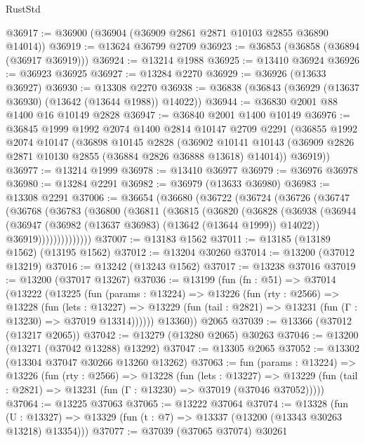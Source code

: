 \begin{lexlean}{RustStd}
\begin{coremodule}
@36917 := @36900 (@36904 (@36909 @2861 @2871 @10103 @2855 @36890 @14014))
@36919 := @13624 @36799 @2709
@36923 := @36853 (@36858 (@36894 (@36917 @36919)))
@36924 := @13214 @1988
@36925 := @13410 @36924
@36926 := @36923 @36925
@36927 := @13284 @2270
@36929 := @36926 (@13633 @36927)
@36930 := @13308 @2270
@36938 := @36838 (@36843 (@36929 (@13637 @36930) (@13642 (@13644 @1988)) @14022))
@36944 := @36830 @2001 @88 @1400 @16 @10149 @2828
@36947 := @36840 @2001 @1400 @10149
@36976 := @36845
    @1999
    @1992
    @2074
    @1400
    @2814
    @10147
    @2709
    @2291
    (@36855
      @1992
      @2074
      @10147
      (@36898
        @10145
        @2828
        (@36902 @10141 @10143 (@36909 @2826 @2871 @10130 @2855 (@36884 @2826 @36888 @13618) @14014))
        @36919))
@36977 := @13214 @1999
@36978 := @13410 @36977
@36979 := @36976 @36978
@36980 := @13284 @2291
@36982 := @36979 (@13633 @36980)
@36983 := @13308 @2291
@37006 := @36654
    (@36680
      (@36722
        (@36724
          (@36726
            (@36747
              (@36768
                (@36783
                  (@36800
                    (@36811
                      (@36815
                        (@36820
                          (@36828
                            (@36938
                              (@36944
                                (@36947 (@36982 (@13637 @36983) (@13642 (@13644 @1999)) @14022))
                                @36919))))))))))))))
@37007 := @13183 @1562
@37011 := @13185 (@13189 @1562) (@13195 @1562)
@37012 := @13204 @30260
@37014 := @13200 (@37012 @13219)
@37016 := @13242 (@13243 @1562)
@37017 := @13238 @37016
@37019 := @13200 (@37017 @13267)
@37036 := @13199
    (fun (fn : @51) =>
    @37014
      (@13222
        (@13225
          (fun (params : @13224) =>
          @13226
            (fun (rty : @2566) =>
            @13228
              (fun (lets : @13227) =>
              @13229 (fun (tail : @2821) => @13231 (fun (Γ : @13230) => @37019 @13314))))))
        @13360))
    @2065
@37039 := @13366 (@37012 (@13217 @2065))
@37042 := @13279 (@13280 @2065) @30263
@37046 := @13200 (@13271 (@37042 @13288) @13292)
@37047 := @13305 @2065
@37052 := @13302 (@13304 @37047 @30266 @13260 @13262)
@37063 := fun (params : @13224) =>
  @13226
    (fun (rty : @2566) =>
    @13228
      (fun (lets : @13227) =>
      @13229 (fun (tail : @2821) => @13231 (fun (Γ : @13230) => @37019 (@37046 @37052)))))
@37064 := @13225 @37063
@37065 := @13222 @37064
@37074 := @13328
    (fun (U : @13327) => @13329 (fun (t : @7) => @13337 (@13200 (@13343 @30263 @13218) @13354)))
@37077 := @37039 (@37065 @37074) @30261

\end{coremodule}
\end{lexlean}
